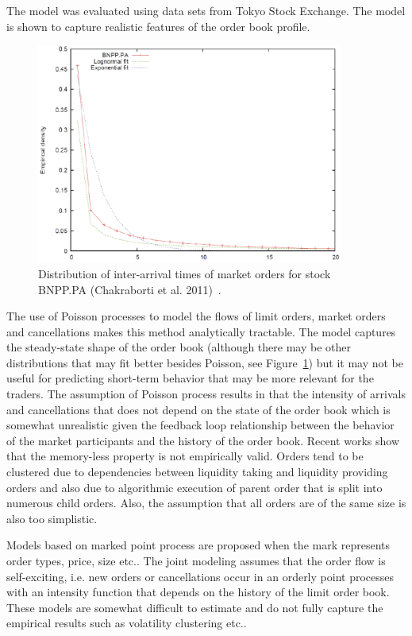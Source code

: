 The model was evaluated using data sets from Tokyo Stock Exchange. The model is shown to capture realistic features of the order book profile.
	\begin{figure}[!ht]
   	\centering
   	\includegraphics[width=0.9\textwidth]{chapters/chapter_trade_data_models/figures/intertime.png} 
   	\caption{Distribution of inter-arrival times of market orders for stock BNPP.PA (Chakraborti et al. 2011)~\cite{chaktokpat}. \label{fig:intertimefig}}
	\end{figure}


The use of Poisson processes to model the flows of limit orders, market orders and cancellations makes this method analytically tractable. The model captures the steady-state shape of the order book (although there may be other distributions that may fit better besides Poisson, see Figure~\ref{fig:intertimefig}) but it may not be useful for predicting short-term behavior that may be more relevant for the traders. The assumption of Poisson process results in that the intensity of arrivals and cancellations that does not depend on the state of the order book which is somewhat unrealistic given the feedback loop relationship between the behavior of the market participants and the history of the order book. Recent works show that the memory-less property is not empirically valid. Orders tend to be clustered due to dependencies between liquidity taking and liquidity providing orders and also due to algorithmic execution of parent order that is split into numerous child orders. Also, the assumption that all orders are of the same size is also too simplistic. 


Models based on marked point process are proposed when the mark represents order types, price, size etc.. The joint modeling assumes that the order flow is self-exciting, i.e. new orders or cancellations occur in an orderly point processes with an intensity function that depends on the history of the limit order book. These models are somewhat difficult to estimate and do not fully capture the empirical results such as volatility clustering etc.. \twomedskip


